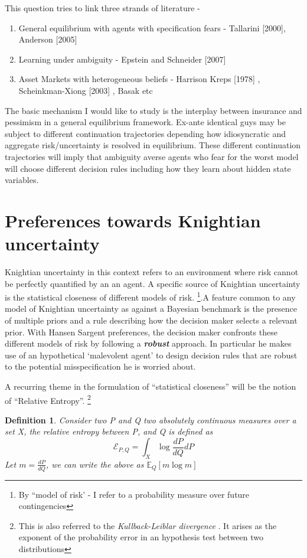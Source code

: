 \documentclass[12pt]{article}
\newtheorem{definition}{Definition}
\begin{document}
\noindent This question tries to link three strands of literature -
\begin{enumerate}
	\item General equilibrium with agents with specification fears - Tallarini [2000], Anderson [2005]
	\item Learning under ambiguity -  Epstein and Schneider [2007]
	\item Asset Markets with heterogeneous beliefs - Harrison Kreps [1978] , Scheinkman-Xiong [2003] , Basak etc
\end{enumerate}

\noindent The basic mechanism I would like to study is the interplay between insurance and pessimism in a general equilibrium framework. Ex-ante identical guys may be subject to different continuation trajectories depending how idiosyncratic and aggregate risk/uncertainty is resolved in equilibrium. These different continuation trajectories will imply that ambiguity averse agents who fear for the worst model will choose different decision rules including how they learn about hidden state variables.
\newpage
\section{Preferences towards Knightian uncertainty}
\noindent Knightian uncertainty in this context refers to an environment where risk cannot be perfectly quantified by an an agent. A specific source of Knightian uncertainty is the statistical closeness of different models of risk. \footnote{By ``model of risk' - I refer to a probability measure over future contingencies}.A feature common to any model of Knightian uncertainty as against a Bayesian benchmark is the presence of multiple priors and a rule describing how the decision maker selects a relevant prior. With Hansen Sargent preferences, the decision maker confronts these different models of risk by following a \textbf{\emph{robust}} approach. In particular he makes use of an hypothetical `malevolent agent' to design decision rules that are robust to the potential misspecification he is worried about. 

\noindent A recurring theme in the formulation of ``statistical closeness'' will be the notion of ``Relative Entropy''. \footnote{This is also referred to the \emph{Kullback-Leiblar divergence} . It arises as the exponent of the probability error in an hypothesis test between two distributions}
\begin{definition}
Consider two P and Q two absolutely continuous measures over a set X, the relative entropy between P, and Q is defined as 
\[\mathcal{E}_{P,Q} = \int_{X}\log\frac{{dP}}{dQ}dP\]
Let $m=\frac{{dP}}{dQ}$, we can write the above as $\mathbb{E}_Q [m \log m]$
\end{definition}
\end{document}
